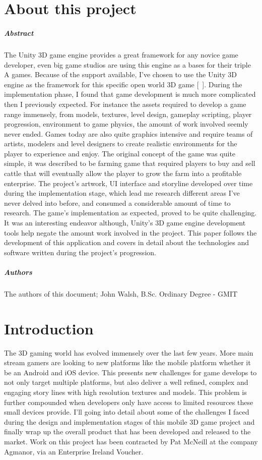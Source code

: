 \chapter*{About this project}
\paragraph{Abstract}
The Unity 3D game engine provides a great framework for any novice game developer, even big game studios are using this engine as a bases for their triple A games. Because of the support available, I've chosen to use the Unity 3D engine as the framework for this specific open world 3D game [~\cite{Unity3D}]. During the implementation phase, I found that game development is much more complicated then I previously expected. For instance the assets required to develop a game range immensely, from models, textures, level design, gameplay scripting, player progression, environment to game physics, the amount of work involved seemly never ended. Games today are also quite graphics intensive and require teams of artists, modelers and level designers to create realistic environments for the player to experience and enjoy. 
The original concept of the game was quite simple, it was described to be farming game that required players to buy and sell cattle that will eventually allow the player to grow the farm into a profitable enterprise. The project's artwork, UI interface and storyline developed over time during the implementation stage, which lead me research different areas I've never delved into before, and consumed a considerable amount of time to research. The game's implementation as expected, proved to be quite challenging. It was an interesting endeavor although, Unity's 3D game engine development tools help negate the amount work involved in the project. This paper follows the development of this application and covers in detail about the technologies and software written during the project's progression.
\paragraph{Authors}
The authors of this document; John Walsh, B.Sc. Ordinary Degree - GMIT
\chapter{Introduction}
The 3D gaming world has evolved immensely over the last few years. More main stream gamers are looking to new platforms like the mobile platform whether it be an Android and iOS device. This presents new challenges for game develops to not only target multiple platforms, but also deliver a well refined, complex and engaging story lines with high resolution textures and models. This problem is further compounded when developers only have access to limited resources these small devices provide. I'll going into detail about some of the challenges I faced during the design and implementation stages of this mobile 3D game project and finally wrap up the overall product that has been developed and released to the market. Work on this project has been contracted by Pat McNeill at the company Agmanor, via an Enterprise Ireland Voucher.
